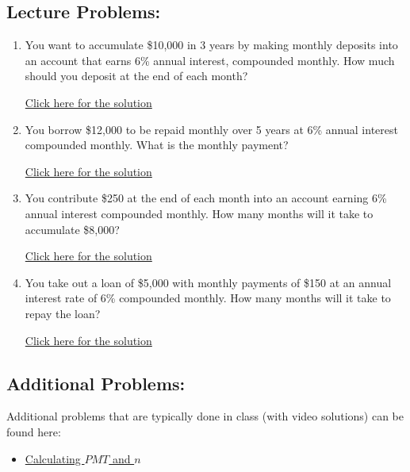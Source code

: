 \documentclass[
]{book}
\providecommand{\tightlist}{%
  \setlength{\itemsep}{0pt}\setlength{\parskip}{0pt}}
\begin{document}
\subsection*{Lecture Problems:}\label{lecture-problems-13}

\begin{enumerate}
\def\labelenumi{\arabic{enumi}.}
\tightlist
\item
  You want to accumulate \$10,000 in 3 years by making monthly deposits into an account that earns 6\% annual interest, compounded monthly. How much should you deposit at the end of each month?

  \href{https://youtu.be/1koRK_dWxOM}{Click here for the solution}
\item
  You borrow \$12,000 to be repaid monthly over 5 years at 6\% annual interest compounded monthly. What is the monthly payment?

  \href{https://youtu.be/iTRNLXzGGvA}{Click here for the solution}
\item
  You contribute \$250 at the end of each month into an account earning 6\% annual interest compounded monthly. How many months will it take to accumulate \$8,000?

  \href{https://youtu.be/g7Z2sU2stCY}{Click here for the solution}
\item
  You take out a loan of \$5,000 with monthly payments of \$150 at an annual interest rate of 6\% compounded monthly. How many months will it take to repay the loan?

  \href{https://youtu.be/CAB2PJszt5I}{Click here for the solution}
\end{enumerate}

\subsection*{Additional Problems:}\label{additional-problems-13}

Additional problems that are typically done in class (with video solutions) can be found here:

\begin{itemize}
\tightlist
\item
  \href{https://theelementsmath.github.io/M114/annuity-basics.html\#calculating-the-periodic-payment-and-number-of-payments}{Calculating \(PMT\) and \(n\)}
\end{itemize}
\end{document}
